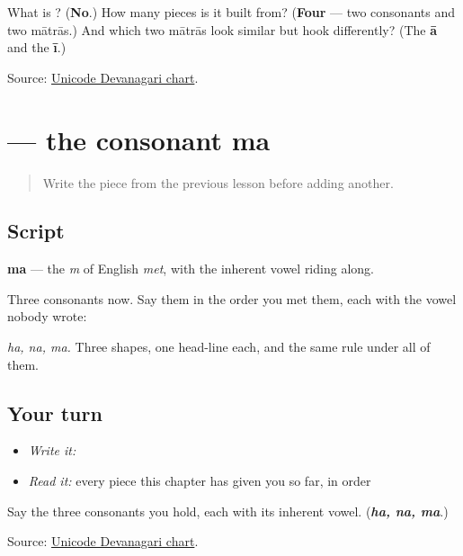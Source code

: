 \begin{tcolorbox}[breakable,colback=teal!4,colframe=teal!35!black,title={Before you move on}]
What is \textbf{}? (\textbf{No}.) How many pieces is it built from? (\textbf{Four} — two consonants and two mātrās.) And which two mātrās look similar but hook differently? (The \textbf{ā} and the \textbf{ī}.)

Source: \href{https://www.unicode.org/charts/PDF/U0900.pdf}{Unicode Devanagari chart}.
\end{tcolorbox}
\section[ma]{ — the consonant ma}

\label{lesson:MR-W01-ma}



\begin{quote}
Write the piece from the previous lesson before adding another.
\end{quote}

\subsection*{Script}
\begin{quote}
\end{quote}

\textbf{ma} — the \emph{m} of English \emph{met}, with the inherent vowel riding along.

Three consonants now. Say them in the order you met them, each with the vowel nobody wrote:

\begin{quote}
\textbf{}   \textbf{}   \textbf{}
\end{quote}

\emph{ha, na, ma.} Three shapes, one head-line each, and the same rule under all of them.

\subsection*{Your turn}
\begin{itemize}
\raggedright
  \item \emph{Write it:} 
  \item \emph{Read it:} every piece this chapter has given you so far, in order
\end{itemize}

\begin{tcolorbox}[breakable,colback=teal!4,colframe=teal!35!black,title={Before you move on}]
Say the three consonants you hold, each with its inherent vowel. (\emph{\textbf{ha, na, ma}}.)

Source: \href{https://www.unicode.org/charts/PDF/U0900.pdf}{Unicode Devanagari chart}.
\end{tcolorbox}
